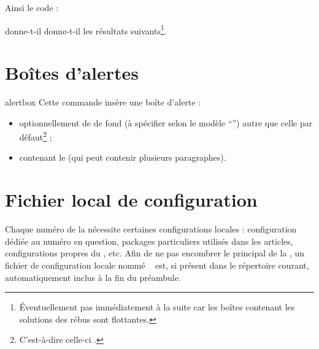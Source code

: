 \documentclass{letgut}
\begin{document}
Ainsi le code :

\begin{ltx-code}[title addon=solution de rébus]
\rebussolution
{}
\end{ltx-code}

donne-t-il donne-t-il les résultats suivants\footnote{Éventuellement pas
  immédiatement à la suite car les boîtes contenant les solutions des rébus sont
  flottantes.}.

\rebussolution
{}

\section{Boîtes d'alertes}
\label{sec:boites-dalertes}

\begin{docCommand}{alertbox}{  }
  Cette commande insère une boîte d'alerte :
  \begin{itemize}
  \item optionnellement de  de fond (à spécifier selon le modèle
    \enquote{}) autre que celle par défaut\footnote{C'est-à-dire
      \colorbox{letgut_default_alert_box_color}{celle-ci}%
      .} ;
  \item contenant le  (qui peut contenir plusieurs paragraphes).
  \end{itemize}
\end{docCommand}

\begin{ltx-code-result}[title addon=boîtes d'alertes]
\end{ltx-code-result}

\section{Fichier local de configuration}
\label{sec:fichier-local-de}

Chaque numéro de la  nécessite certaines configurations locales :
configuration dédiée au numéro en question, packages particuliers utilisés dans
les articles, configurations propres du , etc. Afin de ne pas
encombrer le  principal de la , un fichier de configuration
locale nommé
%
\ExplSyntaxOn
{}~
\ExplSyntaxOff
%
est, si présent dans le répertoire courant, automatiquement inclus à la fin
du préambule.
\end{document}
